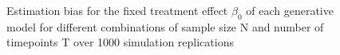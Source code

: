 \documentclass[
  11pt,
  a4paper,
]{article}
\begin{document}
\begin{figure}[H]

\caption{\label{fig-simulation-results}Estimation bias for the fixed
treatment effect \(\beta_0\) of each generative model for different
combinations of sample size N and number of timepoints T over 1000
simulation replications}

\begin{minipage}{0.50\linewidth}



\end{minipage}%
%
\begin{minipage}{0.50\linewidth}


\centering{

}
\end{minipage}
\end{figure}
\end{document}
